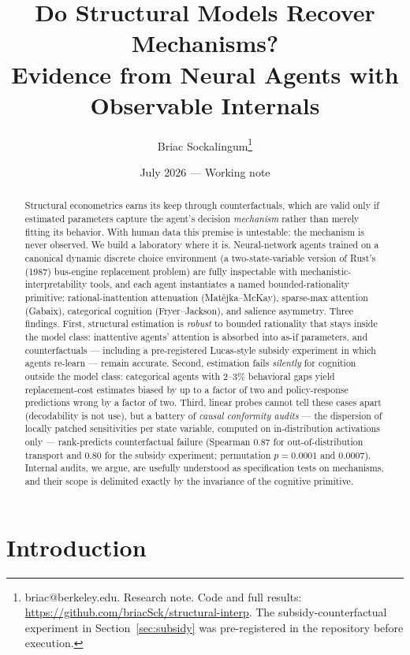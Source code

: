 \documentclass[11pt]{article}
\title{Do Structural Models Recover Mechanisms?\\
\large Evidence from Neural Agents with Observable Internals}
\author{Briac Sockalingum\thanks{briac@berkeley.edu. Research note.
Code and full results: \url{https://github.com/briacSck/structural-interp}.
The subsidy-counterfactual experiment in Section~\ref{sec:subsidy} was
pre-registered in the repository before execution.}}
\date{July 2026 --- Working note}
\begin{document}
\maketitle

\begin{abstract}
\noindent Structural econometrics earns its keep through counterfactuals,
which are valid only if estimated parameters capture the agent's decision
\emph{mechanism} rather than merely fitting its behavior. With human data
this premise is untestable: the mechanism is never observed. We build a
laboratory where it is. Neural-network agents trained on a canonical dynamic
discrete choice environment (a two-state-variable version of Rust's (1987)
bus-engine replacement problem) are fully inspectable with
mechanistic-interpretability tools, and each agent instantiates a named
bounded-rationality primitive: rational-inattention attenuation
(Mat\v{e}jka--McKay), sparse-max attention (Gabaix), categorical cognition
(Fryer--Jackson), and salience asymmetry. Three findings. First, structural
estimation is \emph{robust} to bounded rationality that stays inside the
model class: inattentive agents' attention is absorbed into as-if
parameters, and counterfactuals --- including a pre-registered Lucas-style
subsidy experiment in which agents re-learn --- remain accurate. Second,
estimation fails \emph{silently} for cognition outside the model class:
categorical agents with 2--3\% behavioral gaps yield replacement-cost
estimates biased by up to a factor of two and policy-response predictions
wrong by a factor of two. Third, linear probes cannot tell these cases apart
(decodability is not use), but a battery of \emph{causal conformity audits}
--- the dispersion of locally patched sensitivities per state variable,
computed on in-distribution activations only --- rank-predicts
counterfactual failure (Spearman 0.87 for out-of-distribution transport and
0.80 for the subsidy experiment; permutation $p = 0.0001$ and $0.0007$).
Internal audits, we argue, are usefully understood as specification tests on
mechanisms, and their scope is delimited exactly by the invariance of the
cognitive primitive.
\end{abstract}

\section{Introduction}\label{sec:intro}
\end{document}
